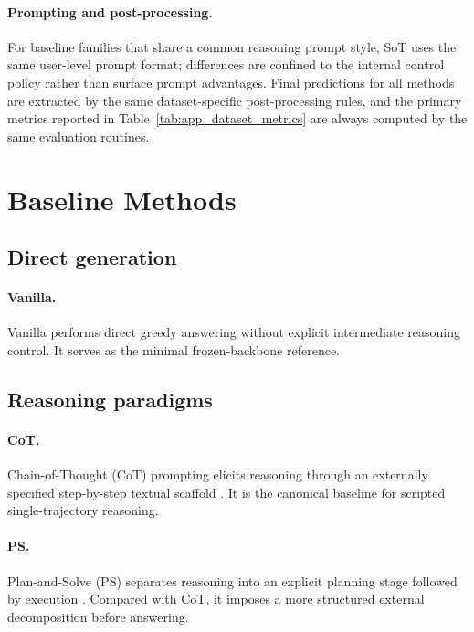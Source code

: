 \paragraph{Prompting and post-processing.}
For baseline families that share a common reasoning prompt style, SoT uses the same user-level prompt format; differences are confined to the internal control policy rather than surface prompt advantages.
Final predictions for all methods are extracted by the same dataset-specific post-processing rules, and the primary metrics reported in Table~\ref{tab:app_dataset_metrics} are always computed by the same evaluation routines.

\vspace{-1mm}
\section{Baseline Methods}
\label{app:baseline_methods}
\vspace{-1mm}
\subsection{Direct generation}
\vspace{-1mm}

\paragraph{\textbf{Vanilla}.}
Vanilla performs direct greedy answering without explicit intermediate reasoning control.
It serves as the minimal frozen-backbone reference.

\vspace{-1mm}
\subsection{Reasoning paradigms}
\vspace{-1mm}

\paragraph{\textbf{CoT}.}
Chain-of-Thought (CoT) prompting elicits reasoning through an externally specified step-by-step textual scaffold \citep{wei2022chain}.
It is the canonical baseline for scripted single-trajectory reasoning.

\paragraph{\textbf{PS}.}
Plan-and-Solve (PS) separates reasoning into an explicit planning stage followed by execution \citep{wang2023plan}.
Compared with CoT, it imposes a more structured external decomposition before answering.

